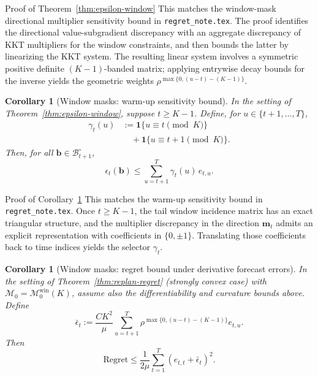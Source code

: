 \documentclass{uai2026} %
\newtheorem{corollary}[theorem]{Corollary}
\newcommand{\1}{\mathbf{1}}
\newcommand{\ind}[1]{\mathbf{1}\{#1\}}
\newcommand{\mcal}{\mathcal{M}}
\begin{document}
\begin{appendixproof}{Proof of Theorem~\ref{thm:epsilon-window}}
  This matches the window-mask directional multiplier sensitivity bound in \texttt{regret\_note.tex}.
  The proof identifies the directional value-subgradient discrepancy with an aggregate discrepancy of KKT multipliers for the window constraints, and then bounds the latter by linearizing the KKT system.
  The resulting linear system involves a symmetric positive definite $(K-1)$-banded matrix; applying entrywise decay bounds for the inverse yields the geometric weights $\rho^{\max\{0,(u-t)-(K-1)\}}$.
\end{appendixproof}

\begin{corollary}[Window masks: warm-up sensitivity bound]
  \label{cor:epsilon-window-warm}
  In the setting of Theorem~\ref{thm:epsilon-window}, suppose $t\ge K-1$.
  Define, for $u\in\{t+1,\dots,T\}$,
  \begin{equation*}
    \begin{split}
      \gamma_t(u)
      &:= \ind{u \equiv t \pmod{K}}\\
      &\quad + \ind{u \equiv t+1 \pmod{K}}.
    \end{split}
  \end{equation*}
  Then, for all $\mathbf{b}\in\mathcal{B}_{t+1}^\circ$,
  \begin{equation*}
    \epsilon_t(\mathbf{b}) \le \sum_{u=t+1}^{T} \gamma_t(u)\, e_{t,u}.
  \end{equation*}
\end{corollary}

\begin{appendixproof}{Proof of Corollary~\ref{cor:epsilon-window-warm}}
  This matches the warm-up sensitivity bound in \texttt{regret\_note.tex}.
  Once $t\ge K-1$, the tail window incidence matrix has an exact triangular structure, and the multiplier discrepancy in the direction $\mathbf{m}_t$ admits an explicit representation with coefficients in $\{0,\pm 1\}$.
  Translating those coefficients back to time indices yields the selector $\gamma_t$.
\end{appendixproof}

\begin{corollary}[Window masks: regret bound under derivative forecast errors]
  \label{cor:regret-window}
  In the setting of Theorem~\ref{thm:replan-regret} (strongly convex case) with $\mcal_{0}=\mcal_{0}^{\mathrm{win}}(K)$, assume also the differentiability and curvature bounds above.
  Define
  \begin{equation*}
    \bar{\epsilon}_t
    :=
    \frac{C K^{2}}{\mu}\sum_{u=t+1}^{T} \rho^{\max\{0,(u-t)-(K-1)\}} e_{t,u}.
  \end{equation*}
  Then
  \begin{equation*}
    \mathrm{Regret} \le \frac{1}{2\mu}\sum_{t=1}^{T}\left(e_{t,t}+\bar{\epsilon}_t\right)^2.
  \end{equation*}
\end{corollary}
\end{document}
